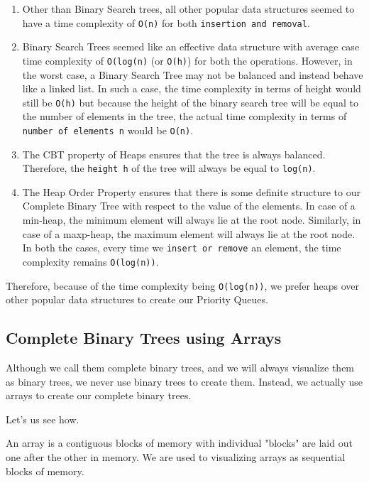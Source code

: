 \documentclass[11pt]{article}
\begin{document}
\begin{enumerate}
\def\labelenumi{\arabic{enumi}.}
\item
  Other than Binary Search trees, all other popular data structures
  seemed to have a time complexity of \texttt{O(n)} for both
  \texttt{insertion\ and\ removal}.
\item
  Binary Search Trees seemed like an effective data structure with
  average case time complexity of \texttt{O(log(n)} (or \texttt{O(h)})
  for both the operations. However, in the worst case, a Binary Search
  Tree may not be balanced and instead behave like a linked list. In
  such a case, the time complexity in terms of height would still be
  \texttt{O(h)} but because the height of the binary search tree will be
  equal to the number of elements in the tree, the actual time
  complexity in terms of \texttt{number\ of\ elements\ n} would be
  \texttt{O(n)}.
\item
  The CBT property of Heaps ensures that the tree is always balanced.
  Therefore, the \texttt{height\ h} of the tree will always be equal to
  \texttt{log(n)}.
\item
  The Heap Order Property ensures that there is some definite structure
  to our Complete Binary Tree with respect to the value of the elements.
  In case of a min-heap, the minimum element will always lie at the root
  node. Similarly, in case of a maxp-heap, the maximum element will
  always lie at the root node. In both the cases, every time we
  \texttt{insert\ or\ remove} an element, the time complexity remains
  \texttt{O(log(n))}.
\end{enumerate}

Therefore, because of the time complexity being \texttt{O(log(n))}, we
prefer heaps over other popular data structures to create our Priority
Queues.

    \subsection{Complete Binary Trees using
Arrays}\label{complete-binary-trees-using-arrays}

Although we call them complete binary trees, and we will always
visualize them as binary trees, we never use binary trees to create
them. Instead, we actually use arrays to create our complete binary
trees.

Let's us see how.

An array is a contiguous blocks of memory with individual "blocks" are
laid out one after the other in memory. We are used to visualizing
arrays as sequential blocks of memory.
\end{document}
